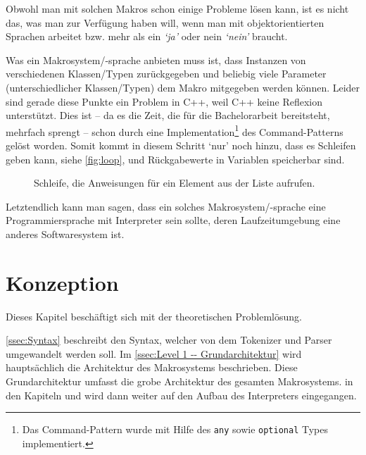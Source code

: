     Obwohl man mit solchen Makros schon einige Probleme lösen kann, ist es nicht das, was man zur Verfügung haben will, wenn man mit objektorientierten Sprachen arbeitet bzw. mehr als ein \textit{`ja'} oder nein \textit{`nein'} braucht.

    Was ein Makrosystem/-sprache anbieten muss ist, dass Instanzen von verschiedenen Klassen/Typen zurückgegeben und beliebig viele Parameter (unterschiedlicher Klassen/Typen) dem Makro mitgegeben werden können. Leider sind gerade diese Punkte ein Problem in C++, weil C++ keine Reflexion\autocites{vinoski2005time}{ferber1989computational} unterstützt. Dies ist -- da es die Zeit, die für die Bachelorarbeit bereitsteht, mehrfach sprengt -- schon durch eine Implementation\footnote{%
      Das Command-Pattern wurde mit Hilfe des \texttt{any}
      sowie \texttt{optional}
      Types implementiert.
    }\spewnotes{}
    des Command-Patterns gelöst worden. Somit kommt in diesem Schritt `nur' noch hinzu, dass es Schleifen geben kann, siehe \autoref{fig:loop}, und Rückgabewerte in Variablen speicherbar sind.

    \begin{figure}[H]
      \centering
      
      \caption{Schleife, die Anweisungen für ein Element aus der Liste aufrufen.}
      \label{fig:loop}
    \end{figure}

    Letztendlich kann man sagen, dass ein solches Makrosystem/-sprache eine Programmiersprache mit Interpreter sein sollte, deren Laufzeitumgebung eine anderes Softwaresystem ist.

\section{Konzeption}
\label{sec:Konzeption}
  Dieses Kapitel beschäftigt sich mit der theoretischen Problemlösung.

  \autoref{ssec:Syntax} beschreibt den Syntax, welcher von dem Tokenizer und Parser umgewandelt werden soll. Im \autoref{ssec:Level 1 -- Grundarchitektur} wird hauptsächlich die Architektur des Makrosystems beschrieben. Diese Grundarchitektur umfasst die grobe Architektur des gesamten Makrosystems. in den Kapiteln  und 
  wird dann weiter auf den Aufbau des Interpreters eingegangen.

